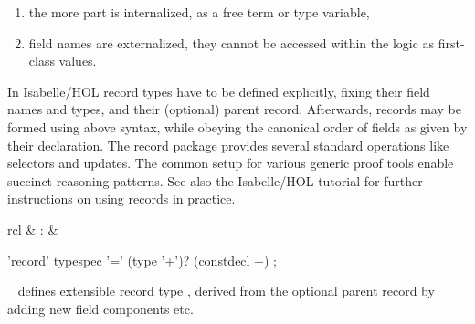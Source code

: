 \begin{isabellebody}
\begin{isamarkuptext}
  \begin{enumerate}

  \item the more part is internalized, as a free term or type
  variable,

  \item field names are externalized, they cannot be accessed within
  the logic as first-class values.

  \end{enumerate}

  \medskip In Isabelle/HOL record types have to be defined explicitly,
  fixing their field names and types, and their (optional) parent
  record.  Afterwards, records may be formed using above syntax, while
  obeying the canonical order of fields as given by their declaration.
  The record package provides several standard operations like
  selectors and updates.  The common setup for various generic proof
  tools enable succinct reasoning patterns.  See also the Isabelle/HOL
  tutorial \cite{isabelle-hol-book} for further instructions on using
  records in practice.%
\end{isamarkuptext}%
\isamarkuptrue%
%
\isamarkuptrue%
%
\begin{isamarkuptext}%
\begin{matharray}{rcl}
    \hypertarget{command.HOL.record}{\hyperlink{command.HOL.record}{\mbox{}}} & : &  \\
  \end{matharray}

  \begin{rail}
    'record' typespec '=' (type '+')? (constdecl +)
    ;
  \end{rail}

  \begin{description}

  \item \hyperlink{command.HOL.record}{\mbox{}}~ defines extensible record type ,
  derived from the optional parent record \isa{{\isachardoublequote}{\isasymtau}{\isachardoublequote}} by adding new
  field components  etc.


\end{description}
\end{isamarkuptext}
\end{isabellebody}
